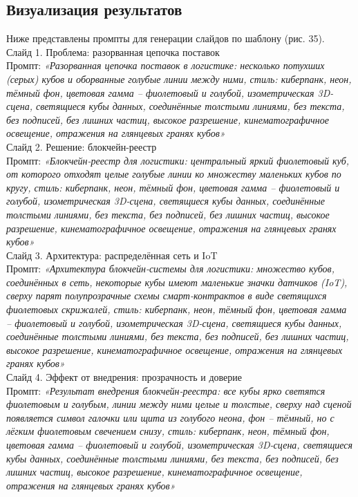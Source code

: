 \subsection{Визуализация результатов}
Ниже представлены промпты для генерации слайдов по шаблону (рис. 35). \\
\newline
Слайд 1. Проблема: разорванная цепочка поставок \\
Промпт: \textit{«Разорванная цепочка поставок в логистике: несколько потухших (серых) кубов и оборванные голубые линии между ними, стиль: киберпанк, неон, тёмный фон, цветовая гамма – фиолетовый и голубой, изометрическая 3D-сцена, светящиеся кубы данных, соединённые толстыми линиями, без текста, без подписей, без лишних частиц, высокое разрешение, кинематографичное освещение, отражения на глянцевых гранях кубов»} \\
\newline
Слайд 2. Решение: блокчейн-реестр \\
Промпт: \textit{«Блокчейн-реестр для логистики: центральный яркий фиолетовый куб, от которого отходят целые голубые линии ко множеству маленьких кубов по кругу, стиль: киберпанк, неон, тёмный фон, цветовая гамма – фиолетовый и голубой, изометрическая 3D-сцена, светящиеся кубы данных, соединённые толстыми линиями, без текста, без подписей, без лишних частиц, высокое разрешение, кинематографичное освещение, отражения на глянцевых гранях кубов»} \\
\newline
Слайд 3. Архитектура: распределённая сеть и IoT \\
Промпт: \textit{«Архитектура блокчейн-системы для логистики: множество кубов, соединённых в сеть, некоторые кубы имеют маленькие значки датчиков (IoT), сверху парят полупрозрачные схемы смарт-контрактов в виде светящихся фиолетовых скрижалей, стиль: киберпанк, неон, тёмный фон, цветовая гамма – фиолетовый и голубой, изометрическая 3D-сцена, светящиеся кубы данных, соединённые толстыми линиями, без текста, без подписей, без лишних частиц, высокое разрешение, кинематографичное освещение, отражения на глянцевых гранях кубов»} \\
\newpage
Слайд 4. Эффект от внедрения: прозрачность и доверие \\
Промпт: \textit{«Результат внедрения блокчейн-реестра: все кубы ярко светятся фиолетовым и голубым, линии между ними целые и толстые, сверху над сценой появляется символ галочки или щита из голубого неона, фон – тёмный, но с лёгким фиолетовым свечением снизу, стиль: киберпанк, неон, тёмный фон, цветовая гамма – фиолетовый и голубой, изометрическая 3D-сцена, светящиеся кубы данных, соединённые толстыми линиями, без текста, без подписей, без лишних частиц, высокое разрешение, кинематографичное освещение, отражения на глянцевых гранях кубов»} \\
